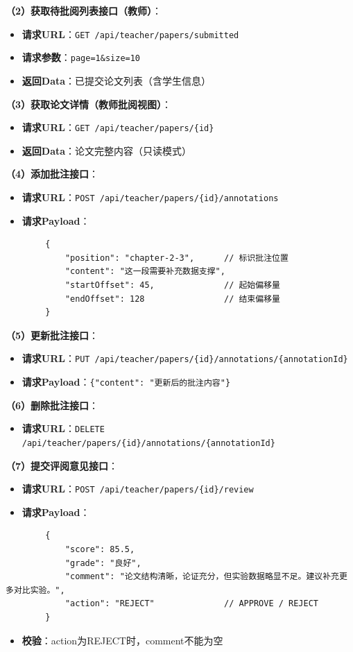 \documentclass{../template/softeng}
\begin{document}
	\textbf{（2）获取待批阅列表接口（教师）}：
	\begin{itemize}
		\item \textbf{请求URL}：\texttt{GET /api/teacher/papers/submitted}
		\item \textbf{请求参数}：\texttt{page=1\&size=10}
		\item \textbf{返回Data}：已提交论文列表（含学生信息）
	\end{itemize}

	\textbf{（3）获取论文详情（教师批阅视图）}：
	\begin{itemize}
		\item \textbf{请求URL}：\texttt{GET /api/teacher/papers/\{id\}}
		\item \textbf{返回Data}：论文完整内容（只读模式）
	\end{itemize}

	\textbf{（4）添加批注接口}：
	\begin{itemize}
		\item \textbf{请求URL}：\texttt{POST /api/teacher/papers/\{id\}/annotations}
		\item \textbf{请求Payload}：
	\end{itemize}
	\begin{verbatim}
		{
			"position": "chapter-2-3",      // 标识批注位置
			"content": "这一段需要补充数据支撑",
			"startOffset": 45,              // 起始偏移量
			"endOffset": 128                // 结束偏移量
		}
	\end{verbatim}

	\textbf{（5）更新批注接口}：
	\begin{itemize}
		\item \textbf{请求URL}：\texttt{PUT /api/teacher/papers/\{id\}/annotations/\{annotationId\}}
		\item \textbf{请求Payload}：\texttt{\{"content": "更新后的批注内容"\}}
	\end{itemize}

	\textbf{（6）删除批注接口}：
	\begin{itemize}
		\item \textbf{请求URL}：\texttt{DELETE /api/teacher/papers/\{id\}/annotations/\{annotationId\}}
	\end{itemize}

	\textbf{（7）提交评阅意见接口}：
	\begin{itemize}
		\item \textbf{请求URL}：\texttt{POST /api/teacher/papers/\{id\}/review}
		\item \textbf{请求Payload}：
	\end{itemize}
	\begin{verbatim}
		{
			"score": 85.5,
			"grade": "良好",
			"comment": "论文结构清晰，论证充分，但实验数据略显不足。建议补充更多对比实验。",
			"action": "REJECT"              // APPROVE / REJECT
		}
	\end{verbatim}
	\begin{itemize}
		\item \textbf{校验}：action为REJECT时，comment不能为空
	\end{itemize}
\end{document}
